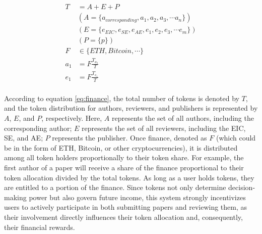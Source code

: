 \documentclass[lettersize,journal]{IEEEtran}
\begin{document}
\begin{equation}
  \begin{aligned}
    T   & = A + E + P                                                \\
        & (A=\{a_{corresponding}, a_1, a_2, a_3, \cdots a_n\})       \\
        & (E=\{e_{EIC}, e_{SE}, e_{AE}, e_1, e_2, e_3, \cdots e_m\}) \\
        & (P=\{p\})                                                  \\
    F   & \in \{ ETH, Bitcoin, \cdots \}                             \\
    a_1 & = F \frac{T_{a_1}}{T}                                      \\
    e_1 & = F \frac{T_{e_1}}{T}                                      \\
  \end{aligned}
  \label{eq:finance}
\end{equation}


According to equation \ref{eq:finance}, the total number of tokens is denoted by $T$, and the token distribution for authors, reviewers, and publishers is represented by $A$, $E$, and $P$, respectively. Here, $A$ represents the set of all authors, including the corresponding author; $E$ represents the set of all reviewers, including the EIC, SE, and AE; $P$ represents the publisher. Once finance, denoted as $F$ (which could be in the form of ETH, Bitcoin, or other cryptocurrencies), it is distributed among all token holders proportionally to their token share. For example, the first author of a paper will receive a share of the finance proportional to their token allocation divided by the total tokens. As long as a user holds tokens, they are entitled to a portion of the finance. Since tokens not only determine decision-making power but also govern future income, this system strongly incentivizes users to actively participate in both submitting papers and reviewing them, as their involvement directly influences their token allocation and, consequently, their financial rewards.
\end{document}
